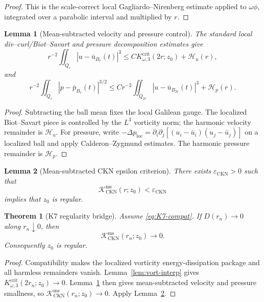 \documentclass[11pt]{article}
\newtheorem{theorem}{Theorem}
\newtheorem{lemma}{Lemma}
\begin{document}
\begin{proof}
This is the scale-correct local Gagliardo--Nirenberg estimate applied to
\(\omega\phi\), integrated over a parabolic interval and multiplied by \(r\).
\end{proof}

\begin{lemma}[Mean-subtracted velocity and pressure control]
\label{lem:velocity-pressure}
The standard local div--curl/Biot--Savart and pressure decomposition estimates
give
\[
r^{-2}\iint_{Q_r}|u-\bar u_{B_r}(t)|^3
\le
C K_{\omega,3}^{\mathrm{crit}}(2r;z_0)+\mathcal H_u(r),
\]
and
\[
r^{-2}\iint_{Q_r}|p-\bar p_{B_r}(t)|^{3/2}
\le
C r^{-2}\iint_{Q_{2r}}|u-\bar u_{B_{2r}}(t)|^3+\mathcal H_p(r).
\]
\end{lemma}

\begin{proof}
Subtracting the ball mean fixes the local Galilean gauge.  The localized
Biot--Savart piece is controlled by the \(L^3\) vorticity norm; the harmonic
velocity remainder is \(\mathcal H_u\).  For pressure, write
\(-\Delta p_{\mathrm{loc}}
=\partial_i\partial_j[(u_i-\bar u_i)(u_j-\bar u_j)]\) on a localized ball and
apply Calderon--Zygmund estimates.  The harmonic pressure remainder is
\(\mathcal H_p\).
\end{proof}

\begin{lemma}[Mean-subtracted CKN epsilon criterion]
\label{lem:CKN}
There exists \(\varepsilon_{\mathrm{CKN}}>0\) such that
\[
\mathcal K_{\mathrm{CKN}}^{\mathrm{ms}}(r;z_0)<\varepsilon_{\mathrm{CKN}}
\]
implies that \(z_0\) is regular.
\end{lemma}

\begin{theorem}[K7 regularity bridge]
\label{thm:K7}
Assume \eqref{eq:K7-compat}.  If \(D(r_n)\to0\) along \(r_n\downarrow0\), then
\[
\mathcal K_{\mathrm{CKN}}^{\mathrm{ms}}(r_n;z_0)\to0.
\]
Consequently \(z_0\) is regular.
\end{theorem}

\begin{proof}
Compatibility makes the localized vorticity energy-dissipation package and all
harmless remainders vanish.  Lemma~\ref{lem:vort-interp} gives
\(K_{\omega,3}^{\mathrm{crit}}(2r_n;z_0)\to0\).  Lemma~\ref{lem:velocity-pressure}
then gives mean-subtracted velocity and pressure smallness, so
\(\mathcal K_{\mathrm{CKN}}^{\mathrm{ms}}(r_n;z_0)\to0\).  Apply
Lemma~\ref{lem:CKN}.
\end{proof}
\end{document}
